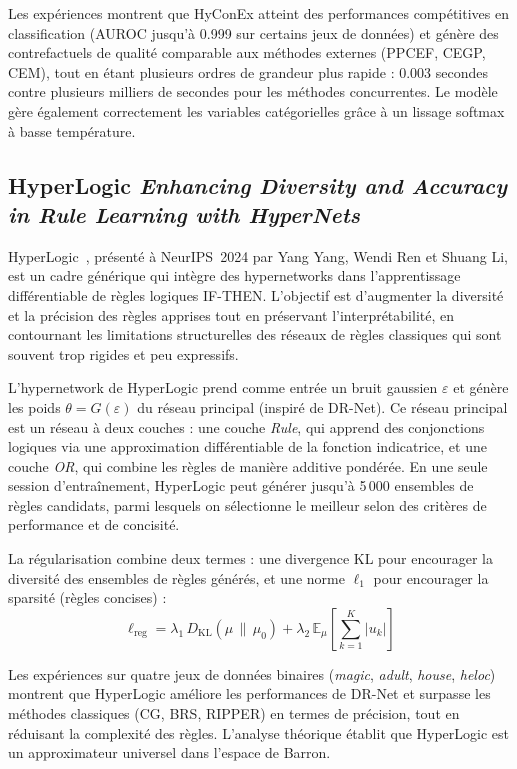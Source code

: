\documentclass[12pt,a4paper]{article}
\begin{document}
Les exp\'eriences montrent que HyConEx atteint des performances comp\'etitives en classification (AUROC jusqu'\`a 0.999 sur certains jeux de donn\'ees) et g\'en\`ere des contrefactuels de qualit\'e comparable aux m\'ethodes externes (PPCEF, CEGP, CEM), tout en \'etant plusieurs ordres de grandeur plus rapide : 0.003 secondes contre plusieurs milliers de secondes pour les m\'ethodes concurrentes. Le mod\`ele g\`ere \'egalement correctement les variables cat\'egorielles gr\^ace \`a un lissage softmax \`a basse temp\'erature.

\subsection{HyperLogic \textit{Enhancing Diversity and Accuracy in Rule Learning with HyperNets}}

HyperLogic~\cite{hyperlogic2024}, pr\'esent\'e \`a NeurIPS~2024 par Yang Yang, Wendi Ren et Shuang Li, est un cadre g\'en\'erique qui int\`egre des hypernetworks dans l'apprentissage diff\'erentiable de r\`egles logiques IF-THEN. L'objectif est d'augmenter la diversit\'e et la pr\'ecision des r\`egles apprises tout en pr\'eservant l'interpr\'etabilit\'e, en contournant les limitations structurelles des r\'eseaux de r\`egles classiques qui sont souvent trop rigides et peu expressifs.

L'hypernetwork de HyperLogic prend comme entr\'ee un bruit gaussien $\varepsilon$ et g\'en\`ere les poids $\theta = G(\varepsilon)$ du r\'eseau principal (inspir\'e de DR-Net). Ce r\'eseau principal est un r\'eseau \`a deux couches : une couche \textit{Rule}, qui apprend des conjonctions logiques via une approximation diff\'erentiable de la fonction indicatrice, et une couche \textit{OR}, qui combine les r\`egles de mani\`ere additive pond\'er\'ee. En une seule session d'entra\^inement, HyperLogic peut g\'en\'erer jusqu'\`a 5\,000 ensembles de r\`egles candidats, parmi lesquels on s\'electionne le meilleur selon des crit\`eres de performance et de concisit\'e.

La r\'egularisation combine deux termes : une divergence KL pour encourager la diversit\'e des ensembles de r\`egles g\'en\'er\'es, et une norme $\ell_1$ pour encourager la sparsit\'e (r\`egles concises) :
\[
\ell_{\text{reg}} = \lambda_1\, D_{\text{KL}}(\mu \,\|\, \mu_0)
+ \lambda_2\, \mathbb{E}_\mu\!\left[\sum_{k=1}^K |u_k|\right]
\]

Les exp\'eriences sur quatre jeux de donn\'ees binaires (\textit{magic}, \textit{adult}, \textit{house}, \textit{heloc}) montrent que HyperLogic am\'eliore les performances de DR-Net et surpasse les m\'ethodes classiques (CG, BRS, RIPPER) en termes de pr\'ecision, tout en r\'eduisant la complexit\'e des r\`egles. L'analyse th\'eorique \'etablit que HyperLogic est un approximateur universel dans l'espace de Barron.
\end{document}
